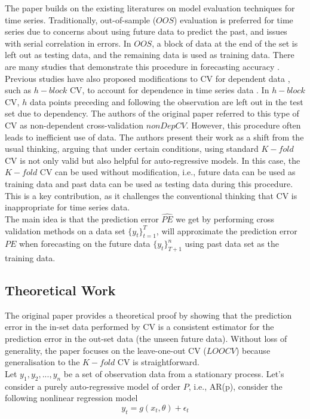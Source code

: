 \documentclass[12pt, oneside]{amsart}
\theoremstyle{definition}
\theoremstyle{remark}
\numberwithin{equation}{section}
\begin{document}
The paper builds on the existing literatures on model evaluation techniques for time series. Traditionally, out-of-sample ($OOS$) evaluation is preferred for time series due to concerns about using future data to predict the past, and issues with serial correlation in errors. In $OOS$, a block of data at the end of the set is left out as testing data, and the remaining data is used as training data. There are many studies that demonstrate this procedure in forecasting accuracy \citep{Tashman}. Previous studies have also proposed modifications to CV for dependent data \citep{Gyorfi, Burman1992, Burman1994}, such as $h-block$ CV, to account for dependence in time series data \citep{Burman1994}. In $h-block$ CV, $h$ data points preceding and following the observation are left out in the test set due to dependency. The authors of the original paper \citep{Bergmeir2018} referred to this type of CV as non-dependent cross-validation $nonDepCV$. However, this procedure often leads to inefficient use of data. The authors present their work as a shift from the usual thinking, arguing that under certain conditions, using standard $K-fold$ CV is not only valid but also helpful for auto-regressive models. In this case, the $K-fold$ CV can be used without modification, i.e., future data can be used as training data and past data can be used as testing data during this procedure. This is a key contribution, as it challenges the conventional thinking that CV is inappropriate for time series data. 
\\

The main idea is that the prediction error $\hat{PE}$ we get by performing cross validation methods on a data set $\{y_t\}_{t=1}^T$, will approximate the prediction error $PE$ when forecasting on the future data $\{y_t\}_{T+1}^n$ using past data set as the training data.  

\subsection{Theoretical Work}
The original paper provides a theoretical proof by showing that the prediction error in the in-set data performed by CV is a consistent estimator for the prediction error in the out-set data (the unseen future data). Without loss of generality, the paper focuses on the leave-one-out CV ($LOOCV$) because generalisation to the $K-fold$ CV is straightforward.
\\

Let $y_1, y_2, ..., y_n$ be a set of observation data from a stationary process. Let's consider a purely auto-regressive model of order $P$, i.e., AR(p), consider the following nonlinear regression model
\begin{equation}\label{eq1}
y_t = g(x_t, \theta) + \epsilon_t
\end{equation}
\end{document}
